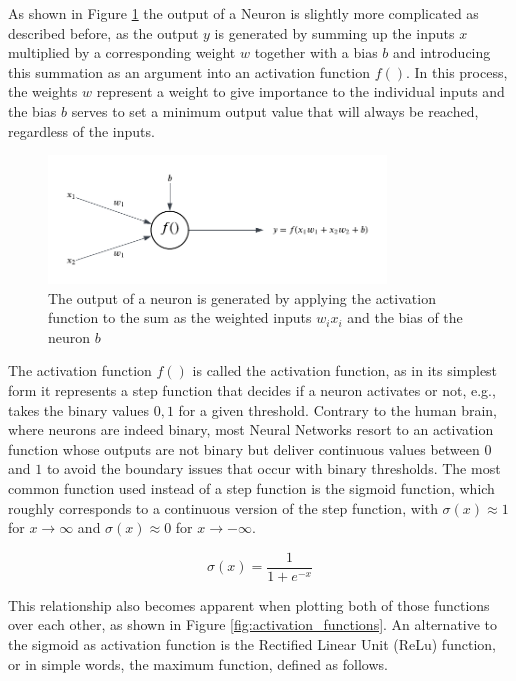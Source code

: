 As shown in Figure \ref{fig:neuron_calculations} the output of a Neuron is slightly more complicated as described before, as the output $y$ is generated by summing up the inputs $x$ multiplied by a corresponding weight $w$ together with a bias $b$ and introducing this summation as an argument into an activation function $f()$. In this process, the weights $w$ represent a weight to give importance to the individual inputs and the bias $b$ serves to set a minimum output value that will always be reached, regardless of the inputs. 

\begin{figure}[h] 
	\centering
	\includegraphics[width=0.8\textwidth]{figures/modelling/perceptron_concept.png} %
	\caption{The output of a neuron is generated by applying the activation function to the sum as the weighted inputs $w_ix_i$ and the bias of the neuron $b$}
	\label{fig:neuron_calculations}
\end{figure}

The activation function $f()$ is called the activation function, as in its simplest form it represents a step function that decides if a neuron activates or not, e.g., takes the binary values ${0,1}$ for a given threshold. Contrary to the human brain, where neurons are indeed binary, most Neural Networks resort to an activation function whose outputs are not binary but deliver continuous values between $0$ and $1$ to avoid the boundary issues that occur with binary thresholds. The most common function used instead of a step function is the sigmoid function, which roughly corresponds to a continuous version of the step function, with $\sigma(x) \approx 1$ for $x \to \infty$ and $\sigma(x) \approx 0$ for $x \to -\infty$.


\[
\sigma(x) = \frac{1}{1 + e^{-x}}
\]

This relationship also becomes apparent when plotting both of those functions over each other, as shown in Figure \ref{fig:activation_functions}. 
An alternative to the sigmoid as activation function is the Rectified Linear Unit (ReLu) function, or in simple words, the maximum function, defined as follows. 

